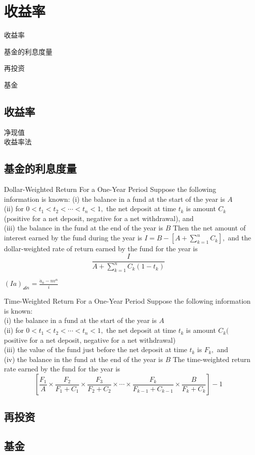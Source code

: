 \chapter{收益率}
\begin{introduction}
	\item 收益率
	\item 基金的利息度量
	\item 再投资
	\item 基金
\end{introduction}
\section{收益率}
净现值
\\收益率法
\section{基金的利息度量}
\begin{definition}{Dollar-Weighted Return For a One-Year Period}
\noindent	Suppose the following information is known:
	(i) the balance in a fund at the start of the year is $A$ \\
	(ii) for $0<t_{1}<t_{2}<\cdots<t_{n}<1,$ the net deposit at time $t_{k}$ is amount $C_{k}$ (positive for a net deposit, negative for a net withdrawal), and \\
	(iii) the balance in the fund at the end of the year is $B$
	Then the net amount of interest earned by the fund during the year is $I=B-\left[A+\sum_{k=1}^{n} C_{k}\right],$ and the dollar-weighted rate of return earned by the fund for the year is
	\[
	\frac{I}{A+\sum_{k=1}^{n} C_{k}\left(1-t_{k}\right)}
	\]
\end{definition}
\begin{remark}
	$(Ia)_{\angles{n}}=\frac{\ddot{a}_{\bar{n}}-n v^{n}}{i}$
\end{remark}
\begin{definition}{Time-Weighted Return For a One-Year Period}
\noinent Suppose the following information is known:\\
	(i) the balance in a fund at the start of the year is $A$\\
	(ii) for $0<t_{1}<t_{2}<\cdots<t_{n}<1,$ the net deposit at time $t_{k}$ is amount $C_{k}($ positive for a net deposit, negative for a net withdrawal)\\
	(iii) the value of the fund just before the net deposit at time $t_{k}$ is $F_{k},$ and\\
	(iv) the balance in the fund at the end of the year is $B$
	The time-weighted return rate earned by the fund for the year is
	\[
	\left[\frac{F_{1}}{A} \times \frac{F_{2}}{F_{1}+C_{1}} \times \frac{F_{3}}{F_{2}+C_{2}} \times \cdots \times \frac{F_{k}}{F_{k-1}+C_{k-1}} \times \frac{B}{F_{k}+C_{k}}\right]-1
	\]	
\end{definition}	
\section{再投资}


\section{基金}